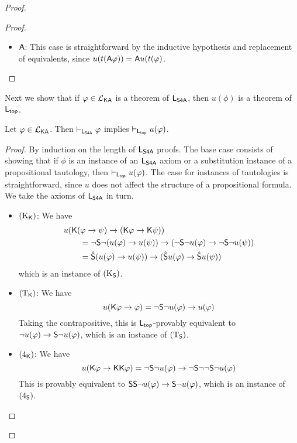 \begin{proof}
\begin{proof}
\begin{itemize}
        \item $\mathsf{A}$: This case is straightforward by the inductive
hypothesis and replacement of equivalents, since
$u(t(\mathsf{A}\varphi)) = \mathsf{A} u(t(\varphi)$.

        \end{itemize}
\end{proof}

Next we show that if $\varphi \in \mathcal{L}_{\mathsf{K}\mathsf{A}}$ is a theorem of
$\mathsf{L}_{\mathsf{S4A}}$, then $u(\phi)$ is a theorem of $\mathsf{L}_{\mathsf{top}}$.

\begin{claim}
\label{exp_claim_u_thm}

Let $\varphi \in \mathcal{L}_{\mathsf{K}\mathsf{A}}$. Then
$\vdash_{\mathsf{L}_{\mathsf{S4A}}} \varphi$ implies $\vdash_{\mathsf{L}_{\mathsf{top}}}
u(\varphi)$.

\end{claim}
    \begin{proof}
    By induction on the length of $\mathsf{L}_{\mathsf{S4A}}$ proofs. The base
case consists of showing that if $\phi$ is an instance of an
$\mathsf{L}_{\mathsf{S4A}}$ axiom or a substitution instance of a
propositional tautology, then $\vdash_{\mathsf{L}_{\mathsf{top}}} u(\varphi)$.
The case for instances of tautologies is straightforward, since
$u$ does not affect the structure of a propositional formula.
We take the axioms of $\mathsf{L}_{\mathsf{S4A}}$ in turn.

    \begin{itemize}
    \item $(\text{K}_{\mathsf{K}})$: We have
        \[
        \begin{aligned}
   &u(\mathsf{K}(\varphi \to \psi) \to (\mathsf{K}\varphi \to \mathsf{K}\psi))
    \\
   &\qquad
   = \neg\mathsf{S}\neg (u(\varphi) \to u(\psi))
        \to (\neg\mathsf{S}\neg u(\varphi) \to \neg\mathsf{S}\neg u(\psi))
       \\
   &\qquad
   = \hat{\mathsf{S}} (u(\varphi) \to u(\psi)) \to
       (\hat{\mathsf{S}} u(\varphi) \to \hat{\mathsf{S}} u(\psi))
\end{aligned}\]
        which is an instance of $(\text{K}_{\mathsf{S}})$.

        \item $(\text{T}_{\mathsf{K}})$: We have
        \[
        u(\mathsf{K}\varphi \to \varphi)
= \neg\mathsf{S}\neg u(\varphi) \to u(\varphi)\]
        Taking the contrapositive, this is $\mathsf{L}_{\mathsf{top}}$-provably
equivalent to $\neg u(\varphi) \to \mathsf{S}\neg u(\varphi)$, which
is an instance of $(\text{T}_{\mathsf{S}})$.

        \item $(\text{4}_{\mathsf{K}})$: We have
        \[
        u(\mathsf{K}\varphi \to \mathsf{K}\mathsf{K}\varphi)
= \neg\mathsf{S}\neg u(\varphi) \to \neg\mathsf{S}\neg\neg\mathsf{S}\neg u(\varphi)\]
        This is provably equivalent to $\mathsf{S}\mathsf{S}\neg u(\varphi) \to
\mathsf{S}\neg u(\varphi)$, which is an instance of $(\text{4}_{\mathsf{S}})$.


\end{itemize}
\end{proof}
\end{proof}
